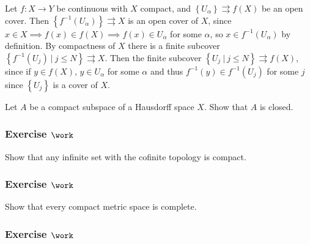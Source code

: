\begin{solution}

\hfill

\begin{concept}

\hfill

\end{concept}

Let \(f:X\to Y\) be continuous with \(X\) compact, and
\(\left\{{U_\alpha}\right\} \rightrightarrows f(X)\) be an open cover.
Then \(\left\{{f^{-1}(U_\alpha)}\right\} \rightrightarrows X\) is an
open cover of \(X\), since
\(x\in X \implies f(x) \in f(X) \implies f(x) \in U_\alpha\) for some
\(\alpha\), so \(x\in f^{-1}(U_\alpha)\) by definition. By compactness
of \(X\) there is a finite subcover
\(\left\{{f^{-1}(U_j) {~\mathrel{\Big|}~}j\leq N}\right\} \rightrightarrows X\).
Then the finite subcover
\(\left\{{U_j{~\mathrel{\Big|}~}j\leq N}\right\} \rightrightarrows f(X)\),
since if \(y\in f(X)\), \(y\in U_\alpha\) for some \(\alpha\) and thus
\(f^{-1}(y) \in f^{-1}(U_j)\) for some \(j\) since
\(\left\{{U_j}\right\}\) is a cover of \(X\).

\end{solution}

Let \(A\) be a compact subspace of a Hausdorff space \(X\). Show that
\(A\) is closed.

\hypertarget{exercise-work-11}{%
\subsubsection{\texorpdfstring{Exercise
\(\work\)}{Exercise \textbackslash work}}\label{exercise-work-11}}

Show that any infinite set with the cofinite topology is compact.

\hypertarget{exercise-work-12}{%
\subsubsection{\texorpdfstring{Exercise
\(\work\)}{Exercise \textbackslash work}}\label{exercise-work-12}}

Show that every compact metric space is complete.

\hypertarget{exercise-work-13}{%
\subsubsection{\texorpdfstring{Exercise
\(\work\)}{Exercise \textbackslash work}}\label{exercise-work-13}}

